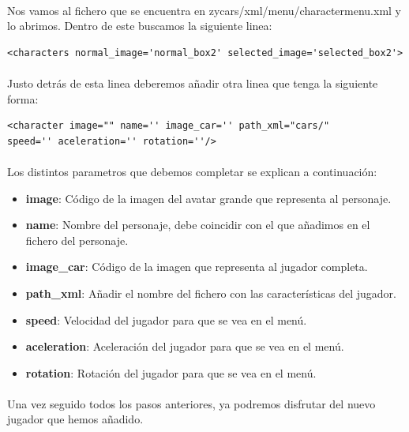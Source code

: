 \paragraph{}
Nos vamos al fichero que se encuentra en zycars/xml/menu/charactermenu.xml y lo abrimos. Dentro de este buscamos la siguiente
linea:

\begin{lstlisting}[style=XML]
<characters normal_image='normal_box2' selected_image='selected_box2'>
\end{lstlisting}

\paragraph{}
Justo detrás de esta linea deberemos añadir otra linea que tenga la siguiente forma:

\begin{lstlisting}[style=XML]
<character image="" name='' image_car='' path_xml="cars/" 
speed='' aceleration='' rotation=''/>
\end{lstlisting}

\paragraph{}
Los distintos parametros que debemos completar se explican a continuación:

\begin{itemize}
    \item \textbf{image}: Código de la imagen del avatar grande que representa al personaje.
    \item \textbf{name}: Nombre del personaje, debe coincidir con el que añadimos en el fichero del personaje.
    \item \textbf{image\_car}: Código de la imagen que representa al jugador completa.
    \item \textbf{path\_xml}: Añadir el nombre del fichero con las características del jugador.
    \item \textbf{speed}: Velocidad del jugador para que se vea en el menú.
    \item \textbf{aceleration}: Aceleración del jugador para que se vea en el menú.
    \item \textbf{rotation}: Rotación del jugador para que se vea en el menú.
\end{itemize}

\paragraph{}
Una vez seguido todos los pasos anteriores, ya podremos disfrutar del nuevo jugador que hemos añadido.
